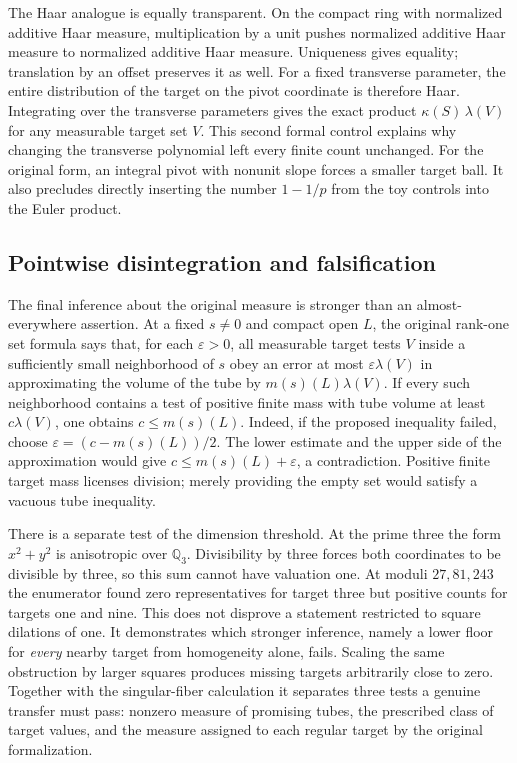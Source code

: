 \documentclass[12pt,letterpaper]{article}
\begin{document}
The Haar analogue is equally transparent. On the compact ring with normalized additive Haar measure, multiplication by a unit pushes normalized additive Haar measure to normalized additive Haar measure. Uniqueness gives equality; translation by an offset preserves it as well. For a fixed transverse parameter, the entire distribution of the target on the pivot coordinate is therefore Haar. Integrating over the transverse parameters gives the exact product $\kappa(S)\,\lambda(V)$ for any measurable target set $V$. This second formal control explains why changing the transverse polynomial left every finite count unchanged. For the original form, an integral pivot with nonunit slope forces a smaller target ball. It also precludes directly inserting the number $1-1/p$ from the toy controls into the Euler product.

\subsection{Pointwise disintegration and falsification}

The final inference about the original measure is stronger than an almost-everywhere assertion. At a fixed $s\ne0$ and compact open $L$, the original rank-one set formula says that, for each $\varepsilon>0$, all measurable target tests $V$ inside a sufficiently small neighborhood of $s$ obey an error at most $\varepsilon\lambda(V)$ in approximating the volume of the tube by $m(s)(L)\lambda(V)$. If every such neighborhood contains a test of positive finite mass with tube volume at least $c\lambda(V)$, one obtains $c\le m(s)(L)$. Indeed, if the proposed inequality failed, choose $\varepsilon=(c-m(s)(L))/2$. The lower estimate and the upper side of the approximation would give $c\le m(s)(L)+\varepsilon$, a contradiction. Positive finite target mass licenses division; merely providing the empty set would satisfy a vacuous tube inequality.

There is a separate test of the dimension threshold. At the prime three the form $x^2+y^2$ is anisotropic over $\mathbb Q_3$. Divisibility by three forces both coordinates to be divisible by three, so this sum cannot have valuation one. At moduli $27,81,243$ the enumerator found zero representatives for target three but positive counts for targets one and nine. This does not disprove a statement restricted to square dilations of one. It demonstrates which stronger inference, namely a lower floor for \emph{every} nearby target from homogeneity alone, fails. Scaling the same obstruction by larger squares produces missing targets arbitrarily close to zero. Together with the singular-fiber calculation it separates three tests a genuine transfer must pass: nonzero measure of promising tubes, the prescribed class of target values, and the measure assigned to each regular target by the original formalization.
\end{document}

